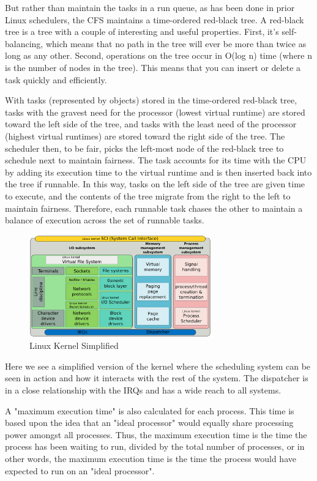 \documentclass{article}
\newcommand{\code}[1]{\codeinline{\texttt{#1}}}
\begin{document}
But rather than maintain the tasks in a run queue, as has been done in prior Linux schedulers, the CFS maintains a time-ordered red-black tree. A red-black tree is a tree with a couple of interesting and useful properties. First, it's self-balancing, which means that no path in the tree will ever be more than twice as long as any other. Second, operations on the tree occur in O(log n) time (where n is the number of nodes in the tree). This means that you can insert or delete a task quickly and efficiently.

With tasks (represented by \code{sched\_entity} objects) stored in the time-ordered red-black tree, tasks with the gravest need for the processor (lowest virtual runtime) are stored toward the left side of the tree, and tasks with the least need of the processor (highest virtual runtimes) are stored toward the right side of the tree. The scheduler then, to be fair, picks the left-most node of the red-black tree to schedule next to maintain fairness. The task accounts for its time with the CPU by adding its execution time to the virtual runtime and is then inserted back into the tree if runnable. In this way, tasks on the left side of the tree are given time to execute, and the contents of the tree migrate from the right to the left to maintain fairness. Therefore, each runnable task chases the other to maintain a balance of execution across the set of runnable tasks.

\begin{figure}[H]
  \centering
  \includegraphics[width=0.7\textwidth]{./pics/linuxkernel.png}
  \caption{Linux Kernel Simplified}
  \label{fig:Linux Kernel Simplified}
\end{figure}

Here we see a simplified version of the kernel where the scheduling system can be seen in action and how it interacts with the rest of the system. The dispatcher is in a close relationship with the IRQs and has a wide reach to all systems.

A "maximum execution time" is also calculated for each process. This time is based upon the idea that an "ideal processor" would equally share processing power amongst all processes. Thus, the maximum execution time is the time the process has been waiting to run, divided by the total number of processes, or in other words, the maximum execution time is the time the process would have expected to run on an "ideal processor".
\end{document}
